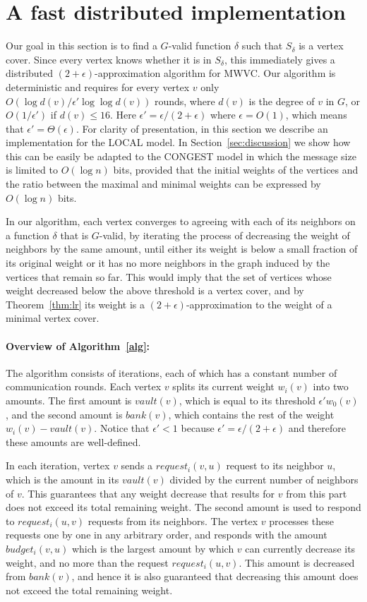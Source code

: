 \documentclass[11pt]{article}
\newcommand{\Deal}{request}
\newcommand{\Vault}{vault}
\newcommand{\Bank}{bank}
\newcommand{\Budget}{budget}
\begin{document}
\section{A fast distributed implementation}
\label{sec:dist}
Our goal in this section is to find a $G$-valid function $\delta$ such that $S_{\delta}$ is a vertex cover. Since every vertex knows whether it is in $S_{\delta}$, this immediately gives a distributed $(2+\epsilon)$-approximation algorithm for MWVC. Our algorithm is deterministic and requires for every vertex $v$ only $O(\log{d(v)}/\epsilon'\log\log{d(v)})$ rounds, where $d(v)$ is the degree of $v$ in $G$, or $O(1/\epsilon')$ if $d(v)\leq 16$. Here $\epsilon'= \epsilon/(2+\epsilon)$ where $\epsilon=O(1)$, which means that $\epsilon'=\Theta(\epsilon)$.
For clarity of presentation, in this section we describe an implementation for the LOCAL model. In Section~\ref{sec:discussion} we show how this can be easily be adapted to the CONGEST model in which the message size is limited to $O(\log{n})$ bits, provided that the initial weights of the vertices and the ratio between the maximal and minimal weights can be expressed by $O(\log{n})$ bits.

In our algorithm, each vertex converges to agreeing with each of its neighbors on a function $\delta$ that is $G$-valid, by iterating the process of decreasing the weight of neighbors by the same amount, until either its weight is below a small fraction of its original weight or it has no more neighbors in the graph induced by the vertices that remain so far. This would imply that the set of vertices whose weight decreased below the above threshold is a vertex cover, and by Theorem~\ref{thm:lr} its weight is a $(2+\epsilon)$-approximation to the weight of a minimal vertex cover.

\paragraph{Overview of Algorithm~\ref{alg}:} The algorithm consists of iterations, each of which has a constant number of communication rounds. Each vertex $v$ splits its current weight $w_i(v)$ into two amounts. The first amount is $\Vault(v)$, which is equal to its threshold $\epsilon' w_0(v)$, and the second amount is $\Bank(v)$, which contains the rest of the weight $w_i(v) - \Vault(v)$. Notice that $\epsilon'<1$ because $\epsilon'= \epsilon/(2+\epsilon)$ and therefore these amounts are well-defined.

In each iteration, vertex $v$ sends a $\Deal_i(v,u)$ request to its neighbor $u$, which is the amount in its $\Vault(v)$ divided by the current number of neighbors of $v$. This guarantees that any weight decrease that results for $v$ from this part does not exceed its total remaining weight. The second amount is used to respond to $\Deal_i(u,v)$ requests from its neighbors. The vertex $v$ processes these requests one by one in any arbitrary order, and responds with the amount $\Budget_i(v,u)$ which is the largest amount by which $v$ can currently decrease its weight, and no more than the request $\Deal_i(u,v)$. This amount is decreased from $\Bank(v)$, and hence it is also guaranteed that decreasing this amount does not exceed the total remaining weight.
\end{document}
